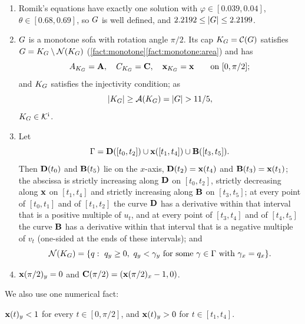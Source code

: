 \begin{fact}\label{fact:gerver}
\begin{enumerate}[label=(\alph*)]
\item\label{fact:gerver:def} Romik's equations have exactly one solution with
$\varphi\in[0.039,0.04]$, $\theta\in[0.68,0.69]$, so $G$ is well defined, and
$2.2192\le\lvert G\rvert\le2.2199$.
\item\label{fact:gerver:cap} $G$ is a monotone sofa with rotation angle
$\pi/2$. Its cap $K_G=\mathcal{C}(G)$ satisfies $G=K_G\setminus\mathcal{N}(K_G)$
(\cref{fact:monotone}\ref{fact:monotone:area}) and has
\[
  A_{K_G}=\mathbf{A},\quad C_{K_G}=\mathbf{C},\quad \mathbf{x}_{K_G}=\mathbf{x}\qquad\text{on }[0,\pi/2];
\]
and $K_G$ satisfies the injectivity condition; as
\[
  \lvert K_G\rvert\ge\mathcal{A}(K_G)=\lvert G\rvert>11/5,
\]
$K_G\in\mathcal{K}^{\mathrm{i}}$. 
\item\label{fact:gerver:niche} Let
\[
  \Gamma=\mathbf{D}([t_0,t_2])\cup\mathbf{x}([t_1,t_4])\cup\mathbf{B}([t_3,t_5]).
\]
Then $\mathbf{D}(t_0)$ and $\mathbf{B}(t_5)$ lie on the $x$-axis, $\mathbf{D}(t_2)=\mathbf{x}(t_4)$ and
$\mathbf{B}(t_3)=\mathbf{x}(t_1)$; the abscissa is strictly increasing along $\mathbf{D}$ on
$[t_0,t_2]$, strictly decreasing along $\mathbf{x}$ on $[t_1,t_4]$ and strictly
increasing along $\mathbf{B}$ on $[t_3,t_5]$; at every point of $[t_0,t_1]$ and of
$[t_1,t_2]$ the curve $\mathbf{D}$ has a derivative within that interval that is a
positive multiple of $u_t$, and at every point of $[t_3,t_4]$ and of
$[t_4,t_5]$ the curve $\mathbf{B}$ has a derivative within that interval that is a
negative multiple of $v_t$ (one-sided at the ends of these intervals); and
\[
  \mathcal{N}(K_G)=\{q:\ q_y\ge0,\ q_y
    <\gamma_y\text{ for some }\gamma\in\Gamma\text{ with }\gamma_x=q_x\}.
\]
\item\label{fact:gerver:endpoint} $\mathbf{x}(\pi/2)_y=0$ and
$\mathbf{C}(\pi/2)=(\mathbf{x}(\pi/2)_x-1,0)$.
\end{enumerate}
\end{fact}

We also use one numerical fact:

\begin{fact}\label{fact:height}
$\mathbf{x}(t)_y<1$ for every $t\in[0,\pi/2]$, and $\mathbf{x}(t)_y>0$ for $t\in[t_1,t_4]$.
\end{fact}
